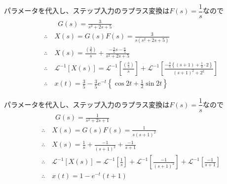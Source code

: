 \documentclass[a4paper,12pt]{article}
\begin{document}
\begin{tcolorbox}[title={6. (3)\(m=1,d=2,k_1=3,k_2=2\)とし、ステップ応答を求めよ。 
    }]
    パラメータを代入し、ステップ入力のラプラス変換は\(F(s)=\dfrac{1}{s}\)なので
    \vspace{-4mm}
    \begin{align*}
        &\qquad G(s) = \frac{3}{s^2 + 2s + 5 } \\
        &\therefore \quad X(s) = G(s) F(s) 
        = \frac{3}{s(s^2 + 2s + 5)} \\
        &\therefore \quad X(s) = \frac{\left(\frac{3}{5}\right)}{s}
        +\frac{-\frac{3}{5}s-\frac{6}{5}}{s^2 + 2s + 5} \\
        &\therefore \quad \mathcal{L}^{-1} \left[ X(s)\right] 
        = \mathcal{L}^{-1} \left[\frac{\left(\frac{3}{5}\right)}{s}\right] 
        + \mathcal{L}^{-1} \left[\frac{-\frac{3}{5}\left\{(s+1)+\frac{1}{2}\cdot 2\right\}}{\left(s+1\right)^2+2^2} \right] \\
        &\therefore \quad x(t) = \frac{3}{5} -\frac{3}{5} e^{-t} \left\{ \cos 2t + \frac{1}{2} \sin 2t\right\}
    \end{align*}

\end{tcolorbox}

\begin{tcolorbox}[title={6. (4)\(m=1,d=2,k_1=1,k_2=0\)とし、ステップ応答を求めよ。 
    }]
    パラメータを代入し、ステップ入力のラプラス変換は\(F(s)=\dfrac{1}{s}\)なので
    \vspace{-4mm}
    \begin{align*}
        &\qquad G(s) = \frac{1}{s^2 + 2s + 1} \\
        &\therefore \quad X(s) = G(s) F(s) = \frac{1}{s(s+1)^2} \\
        &\therefore \quad X(s) = \frac{1}{s}+\frac{-1}{(s+1)^2}+\frac{-1}{s+1} \\
        &\therefore \quad \mathcal{L}^{-1} \left[ X(s)\right] 
        = \mathcal{L}^{-1} \left[\frac{1}{s}\right] 
        + \mathcal{L}^{-1} \left[\frac{-1}{(s+1)^2} \right]
        + \mathcal{L}^{-1} \left[\frac{-1}{s+1} \right] \\
        &\therefore \quad x(t) = 1 - e^{-t}(t+1)
    \end{align*}

\end{tcolorbox}
\end{document}
